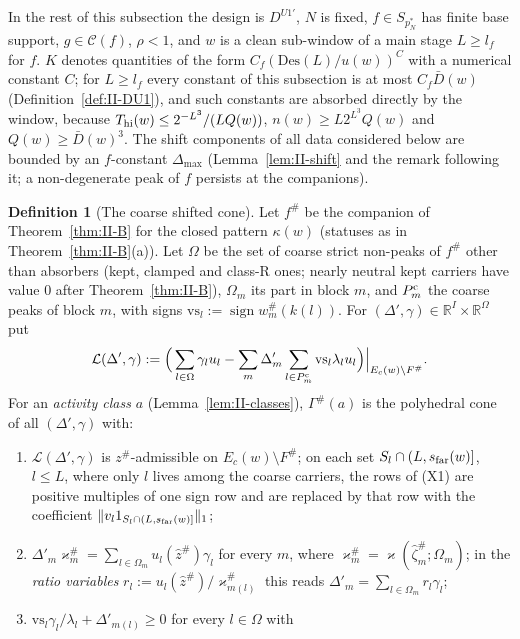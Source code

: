 \documentclass[10pt]{amsart}
\theoremstyle{definition}
\newtheorem{definition}[theorem]{Definition}
\theoremstyle{remark}
\newcommand{\sgn}{\operatorname{sign}}
\newcommand{\R}{\mathbb R}
\newcommand{\Cset}{\mathcal C}
\newcommand{\zh}{\hat z}
\begin{document}
In the rest of this subsection the design is $D^{U1'}$, $N$ is fixed, $f\in
S_{p_N^*}$ has finite base support, $g\in\Cset(f)$, $\rho<1$, and $w$ is a clean
sub-window of a main stage $L\ge l_f$ for $f$.  $K$ denotes quantities of the
form $C_f(\mathrm{Des}(L)/u(w))^C$ with a numerical constant $C$; for $L\ge
l_f$ every constant of this subsection is at most $C_f\bar D(w)$
(Definition~\ref{def:II-DU1}), and such constants are absorbed directly by
the window, because $T_{\rm hi}(w)\le2^{-L^3}/(LQ(w))$, $n(w)\ge L2^{L^3}Q(w)$
and $Q(w)\ge\bar D(w)^3$.  The
shift components of all data considered below are bounded by an $f$-constant
$\Delta_{\max}$ (Lemma~\ref{lem:II-shift} and the remark following it; a
non-degenerate peak of $f$ persists at the companions).

\begin{definition}[The coarse shifted cone]\label{def:II-Gamma}
Let $f^\#$ be the companion of Theorem~\ref{thm:II-B} for the closed pattern
$\kappa(w)$ (statuses as in Theorem~\ref{thm:II-B}(a)).  Let $\Omega$ be the set of coarse strict non-peaks of
$f^\#$ other than absorbers (kept, clamped and class-R ones; nearly neutral kept
carriers have value $0$ after Theorem~\ref{thm:II-B}), $\Omega_m$ its part in block $m$,
and $P^{\rm c}_m$ the coarse peaks of block $m$, with signs $\mathrm{vs}_l:=\sgn w^\#_m(k(l))$.
For $(\Delta',\gamma)\in\R^I\times\R^\Omega$ put
\[
 \mathcal L(\Delta',\gamma):=\Big(\sum_{l\in\Omega}\gamma_lu_l-\sum_m\Delta'_m\sum_{l\in P^{\rm c}_m}
 \mathrm{vs}_l\lambda_lu_l\Big)\Big|_{E_c(w)\setminus F^\#} .
\]
For an \emph{activity class} $a$ (Lemma~\ref{lem:II-classes}), $\Gamma^\#(a)$ is the
polyhedral cone of all $(\Delta',\gamma)$ with:
\begin{enumerate}
\item[(X1)] $\mathcal L(\Delta',\gamma)$ is $z^\#$-admissible on $E_c(w)\setminus F^\#$;
on each set $S_l\cap(L,s_{\rm far}(w)]$, $l\le L$, where only $l$ lives among the
coarse carriers, the rows of (X1) are positive multiples of one sign row and are
replaced by that row with the coefficient $\|v_l1_{S_l\cap(L,s_{\rm far}(w)]}\|_1$;
\item[(X3)] $\Delta'_m\varkappa^\#_m=\sum_{l\in\Omega_m}u_l(\zh^\#)\gamma_l$ for every $m$, where
$\varkappa^\#_m=\varkappa(\hat\zeta^\#_m;\Omega_m)$; in the \emph{ratio variables} $r_l:=
u_l(\zh^\#)/\varkappa^\#_{m(l)}$ this reads $\Delta'_m=\sum_{l\in\Omega_m}r_l\gamma_l$;
\item[(X4)] $\mathrm{vs}_l\gamma_l/\lambda_l+\Delta'_{m(l)}\ge0$ for every $l\in\Omega$ with

\end{enumerate}
\end{definition}
\end{document}
